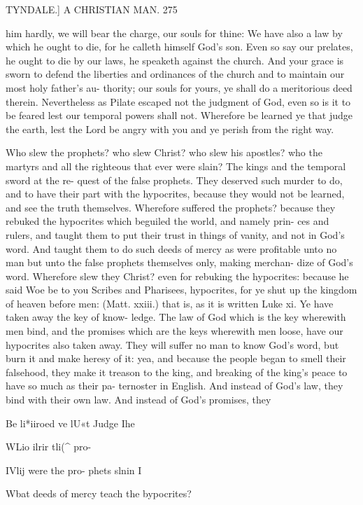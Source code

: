 \documentclass{custom}
\begin{document}
{TYNDALE.]
A CHRISTIAN MAN.
275 

him hardly, we will bear the charge, our souls for thine: 
We have also a law by which he ought to die, for he calleth 
himself God's son. Even so say our prelates, he ought to 
die by our laws, he speaketh against the church. And 
your grace is sworn to defend the liberties and ordinances 
of the church and to maintain our most holy father's au- 
thority; our souls for yours, ye shall do a meritorious deed 
therein. Nevertheless as Pilate escaped not the judgment of 
God, even so is it to be feared lest our temporal powers shall 
not. Wherefore be learned ye that judge the earth, lest the 
Lord be angry with you and ye perish from the right way. 

Who slew the prophets? who slew Christ? who slew his 
apostles? who the martyrs and all the righteous that ever 
were slain? The kings and the temporal sword at the re- 
quest of the false prophets. They deserved such murder 
to do, and to have their part with the hypocrites, because 
they would not be learned, and see the truth themselves. 
Wherefore suffered the prophets? because they rebuked 
the hypocrites which beguiled the world, and namely prin- 
ces and rulers, and taught them to put their trust in things 
of vanity, and not in God's word. And taught them to do 
such deeds of mercy as were profitable unto no man but 
unto the false prophets themselves only, making merchan- 
dize of God's word. Wherefore slew they Christ? even 
for rebuking the hypocrites: because he said Woe be to 
you Scribes and Pharisees, hypocrites, for ye shut up the 
kingdom of heaven before men: (Matt. xxiii.) that is, as it 
is written Luke xi. Ye have taken away the key of know- 
ledge. The law of God which is the key wherewith men 
bind, and the promises which are the keys wherewith 
men loose, have our hypocrites also taken away. They 
will suffer no man to know God's word, but burn it and 
make heresy of it: yea, and because the people began to 
smell their falsehood, they make it treason to the king, and 
breaking of the king's peace to have so much as their pa- 
ternoster in English. And instead of God's law, they bind 
with their own law. And instead of God's promises, they 

Be li*iiroed 
ve lU«t 
Judge Ihe 

WLio ilrir 
tli(^ pro- 

IVlij were 
the pro- 
phets slnin I 

Wbat deeds 
of mercy 
teach the 
bypocrites? 

}
\end{document}
